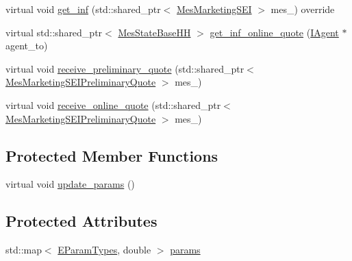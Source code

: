 {\bf }\par
\begin{DoxyCompactItemize}
\item 
virtual void \hyperlink{classsolar__core_1_1_household_ac9d26af7b52f0cdc357fc5dca4b86ad9}{get\+\_\+inf} (std\+::shared\+\_\+ptr$<$ \hyperlink{classsolar__core_1_1_mes_marketing_s_e_i}{Mes\+Marketing\+S\+E\+I} $>$ mes\+\_\+) override
\item 
virtual std\+::shared\+\_\+ptr$<$ \hyperlink{classsolar__core_1_1_mes_state_base_h_h}{Mes\+State\+Base\+H\+H} $>$ \hyperlink{classsolar__core_1_1_household_a008a18ff8c2d15da72e19876dc896a4e}{get\+\_\+inf\+\_\+online\+\_\+quote} (\hyperlink{classsolar__core_1_1_i_agent}{I\+Agent} $\ast$agent\+\_\+to)
\item 
virtual void \hyperlink{classsolar__core_1_1_household_a48d1f7b276e546dd9ff903bfc965cc5d}{receive\+\_\+preliminary\+\_\+quote} (std\+::shared\+\_\+ptr$<$ \hyperlink{classsolar__core_1_1_mes_marketing_s_e_i_preliminary_quote}{Mes\+Marketing\+S\+E\+I\+Preliminary\+Quote} $>$ mes\+\_\+)
\item 
virtual void \hyperlink{classsolar__core_1_1_household_a39a2cb8b49d8e23c15fb7f7fc67ef0b2}{receive\+\_\+online\+\_\+quote} (std\+::shared\+\_\+ptr$<$ \hyperlink{classsolar__core_1_1_mes_marketing_s_e_i_preliminary_quote}{Mes\+Marketing\+S\+E\+I\+Preliminary\+Quote} $>$ mes\+\_\+)
\end{DoxyCompactItemize}

\subsection*{Protected Member Functions}
{\bf }\par
\begin{DoxyCompactItemize}
\item 
virtual void \hyperlink{classsolar__core_1_1_household_a733a90456d57f698b3aa974c6c6e0108}{update\+\_\+params} ()
\end{DoxyCompactItemize}

\subsection*{Protected Attributes}
{\bf }\par
\begin{DoxyCompactItemize}
\item 
std\+::map$<$ \hyperlink{namespacesolar__core_aa1147341e5ef7a40d68d1bd68e149362}{E\+Param\+Types}, double $>$ \hyperlink{classsolar__core_1_1_household_a41d61dc3bab971cb19170341b77d9df8}{params}
\end{DoxyCompactItemize}

